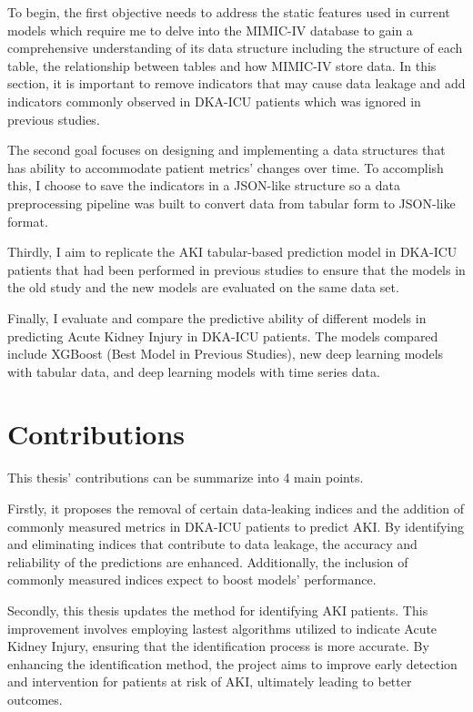 \documentclass[../main.tex]{subfiles}
\begin{document}
To begin, the first objective needs to address the static features used  in current models which require me to delve into the MIMIC-IV database to gain a comprehensive understanding of its data structure including the structure of each table, the relationship between tables and how MIMIC-IV store data.
In this section, it is important to remove indicators that may cause data leakage and add indicators commonly observed in DKA-ICU patients which was ignored in previous studies.

The second goal focuses on designing and implementing a data structures that has ability to accommodate patient metrics' changes over time.
To accomplish this, I choose to save the indicators in a JSON-like structure so a data preprocessing pipeline was built to convert data from tabular form to JSON-like format.

Thirdly, I aim to replicate the AKI tabular-based prediction model in DKA-ICU patients that had been performed in previous studies to ensure that the models in the old study and the new models are evaluated on the same data set.

Finally, I evaluate and compare the predictive ability of different models in predicting Acute Kidney Injury in DKA-ICU patients.
The models compared include XGBoost (Best Model in Previous Studies), new deep learning models with tabular data, and deep learning models with time series data.

\section{Contributions}

This thesis' contributions can be summarize into 4 main points.

Firstly, it proposes the removal of certain data-leaking indices and the addition of commonly measured metrics in DKA-ICU patients to predict AKI. 
By identifying and eliminating indices that contribute to data leakage, the accuracy and reliability of the predictions are enhanced. 
Additionally, the inclusion of commonly measured indices expect to boost models' performance.

Secondly, this thesis updates the method for identifying AKI patients. This improvement involves employing lastest algorithms utilized to indicate Acute Kidney Injury, ensuring that the identification process is more accurate.
By enhancing the identification method, the project aims to improve early detection and intervention for patients at risk of AKI, ultimately leading to better outcomes.
\end{document}
